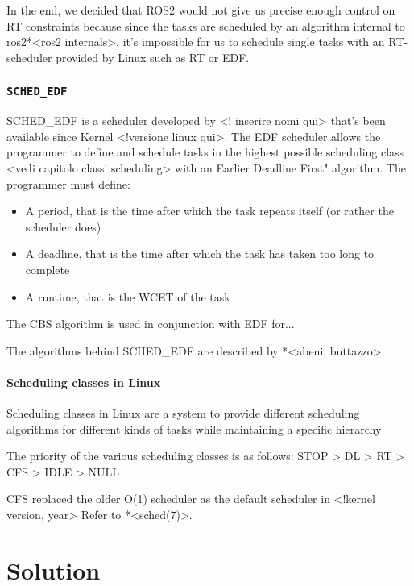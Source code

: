\documentclass[a4paper,12pt]{report}
\begin{document}
In the end, we decided that ROS2 would not give us precise enough control on RT constraints because since the tasks are scheduled by an algorithm internal to ros2*<ros2 internals>, it's impossible for us to schedule single tasks with an RT-scheduler provided by Linux such as RT or EDF. 

\subsection{\texttt{SCHED\_EDF}}

SCHED\_EDF is a scheduler developed by <! inserire nomi qui> that's been available since Kernel <!versione linux qui>. The EDF scheduler allows the programmer to define and schedule tasks in the highest possible scheduling class <vedi capitolo classi scheduling> with an Earlier Deadline First" algorithm. The programmer must define:

\begin{itemize}
    \item A period, that is the time after which the task repeats itself (or rather the scheduler does)
    \item A deadline, that is the time after which the task has taken too long to complete
    \item A runtime, that is the WCET of the task
\end{itemize}

The CBS algorithm is used in conjunction with EDF for...

The algorithms behind SCHED\_EDF are described by *<abeni, buttazzo>.

\subsubsection{Scheduling classes in Linux}

Scheduling classes in Linux are a system to provide different scheduling algorithms for different kinds of tasks while maintaining a specific hierarchy 

The priority of the various scheduling classes is as follows:
STOP > DL > RT > CFS > IDLE > NULL

CFS replaced the older O(1) scheduler as the default scheduler in <!kernel version, year> Refer to *<sched(7)>.

\newpage
\chapter{Solution}
\end{document}
